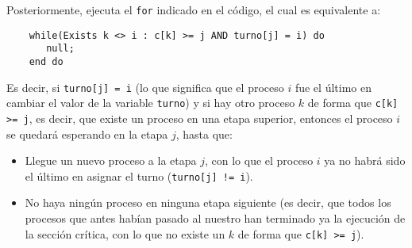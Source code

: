 Posteriormente, ejecuta el \verb|for| indicado en el código, el cual es equivalente a:
\begin{verbatim}
    while(Exists k <> i : c[k] >= j AND turno[j] = i) do 
       null;
    end do
\end{verbatim}
Es decir, si \verb|turno[j] = i| (lo que significa que el proceso $i$ fue el último en cambiar el valor de la variable \verb|turno|) y si hay otro proceso $k$ de forma que \verb|c[k] >= j|, es decir, que existe un proceso en una etapa superior, entonces el proceso $i$ se quedará esperando en la etapa $j$, hasta que:
\begin{itemize}
    \item Llegue un nuevo proceso a la etapa $j$, con lo que el proceso $i$ ya no habrá sido el último en asignar el turno (\verb|turno[j] != i|).
    \item No haya ningún proceso en ninguna etapa siguiente (es decir, que todos los procesos que antes habían pasado al nuestro han terminado ya la ejecución de la sección crítica, con lo que no existe un $k$ de forma que \verb|c[k] >= j|).
\end{itemize}

